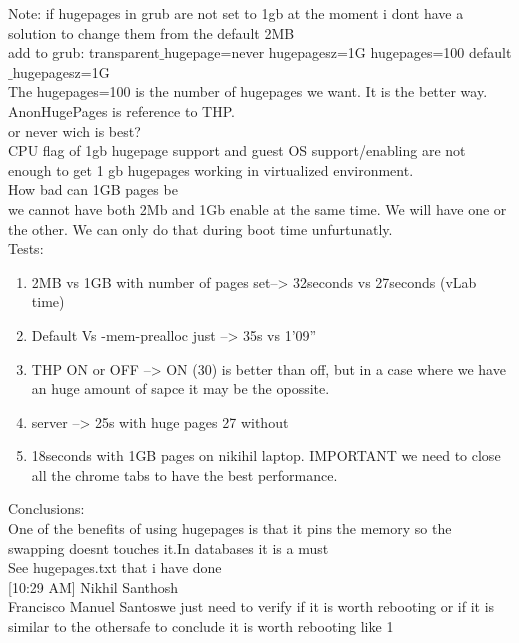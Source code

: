 \documentclass[11pt, a4paper, oneside]{article}
\theoremstyle{definition}
\begin{document}
Note: if hugepages in grub are not set to 1gb at the moment i dont have a solution to change them from the default 2MB\\
add to grub: transparent$\_$hugepage=never hugepagesz=1G hugepages=100 default$\_$hugepagesz=1G\\
The hugepages=100 is the number of hugepages we want. It is the better way.\\
AnonHugePages is reference to THP.\\

or never wich is best?\\
CPU flag of 1gb hugepage support and guest OS support/enabling are not enough to get 1 gb hugepages working in virtualized environment. \\
How bad can 1GB pages be\\

we cannot have both 2Mb and 1Gb enable at the same time. We will have one or the other. We can only do that during boot time unfurtunatly.\\

Tests:\\
\begin{enumerate}
	\item 2MB vs 1GB with number of pages set--> 32seconds vs 27seconds (vLab time)
	\item Default Vs -mem-prealloc just --> 35s vs 1'09''
	\item THP ON or OFF --> ON (30) is better than off, but in a case where we have an huge amount of sapce it may be the opossite.\\
	\item server --> 25s with huge pages 27 without
	\item 18seconds with 1GB pages on nikihil laptop. IMPORTANT we need to close all the chrome tabs to have the best performance.
\end{enumerate}
Conclusions:\\

One of the benefits of using hugepages is that it pins the memory so the swapping doesnt touches it.In databases it is a must\\  

See hugepages.txt that i have done\\

[10:29 AM] Nikhil Santhosh\\
Francisco Manuel Santoswe just need to verify if it is worth rebooting or if it is similar to the othersafe to conclude it is worth rebooting
 like 1\\
\end{document}
